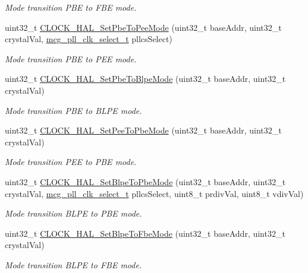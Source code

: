 \begin{DoxyCompactItemize}
\begin{DoxyCompactList}\small\item\em Mode transition P\+BE to F\+BE mode. \end{DoxyCompactList}\item 
uint32\+\_\+t \hyperlink{group__mcg__hal_ga00d1a2e9400348e93f64ca8acfe37779}{C\+L\+O\+C\+K\+\_\+\+H\+A\+L\+\_\+\+Set\+Pbe\+To\+Pee\+Mode} (uint32\+\_\+t base\+Addr, uint32\+\_\+t crystal\+Val, \hyperlink{group__mcg__hal_gabb093003f85a2f62fc0769b22daba84d}{mcg\+\_\+pll\+\_\+clk\+\_\+select\+\_\+t} pllcs\+Select)
\begin{DoxyCompactList}\small\item\em Mode transition P\+BE to P\+EE mode. \end{DoxyCompactList}\item 
uint32\+\_\+t \hyperlink{group__mcg__hal_ga8a23e7fbc205c92016ac355a2134abe8}{C\+L\+O\+C\+K\+\_\+\+H\+A\+L\+\_\+\+Set\+Pbe\+To\+Blpe\+Mode} (uint32\+\_\+t base\+Addr, uint32\+\_\+t crystal\+Val)
\begin{DoxyCompactList}\small\item\em Mode transition P\+BE to B\+L\+PE mode. \end{DoxyCompactList}\item 
uint32\+\_\+t \hyperlink{group__mcg__hal_ga928c49962982acb63aae49da6c68e6fb}{C\+L\+O\+C\+K\+\_\+\+H\+A\+L\+\_\+\+Set\+Pee\+To\+Pbe\+Mode} (uint32\+\_\+t base\+Addr, uint32\+\_\+t crystal\+Val)
\begin{DoxyCompactList}\small\item\em Mode transition P\+EE to P\+BE mode. \end{DoxyCompactList}\item 
uint32\+\_\+t \hyperlink{group__mcg__hal_ga492c0e725461e6c9c5c5b4e84fa9f4b1}{C\+L\+O\+C\+K\+\_\+\+H\+A\+L\+\_\+\+Set\+Blpe\+To\+Pbe\+Mode} (uint32\+\_\+t base\+Addr, uint32\+\_\+t crystal\+Val, \hyperlink{group__mcg__hal_gabb093003f85a2f62fc0769b22daba84d}{mcg\+\_\+pll\+\_\+clk\+\_\+select\+\_\+t} pllcs\+Select, uint8\+\_\+t prdiv\+Val, uint8\+\_\+t vdiv\+Val)
\begin{DoxyCompactList}\small\item\em Mode transition B\+L\+PE to P\+BE mode. \end{DoxyCompactList}\item 
uint32\+\_\+t \hyperlink{group__mcg__hal_gac3edb4af76aaa2ab7df48fb12cc591eb}{C\+L\+O\+C\+K\+\_\+\+H\+A\+L\+\_\+\+Set\+Blpe\+To\+Fbe\+Mode} (uint32\+\_\+t base\+Addr, uint32\+\_\+t crystal\+Val)
\begin{DoxyCompactList}\small\item\em Mode transition B\+L\+PE to F\+BE mode. \end{DoxyCompactList}\end{DoxyCompactItemize}
